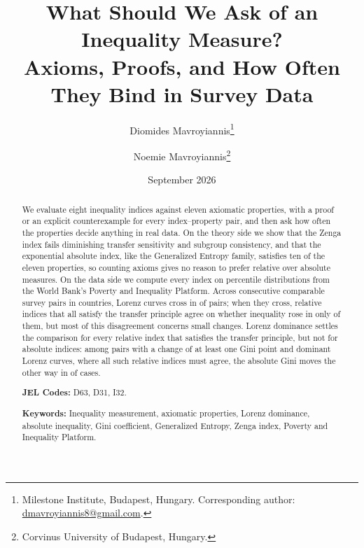 \documentclass[12pt]{article}
\theoremstyle{plain}
\theoremstyle{definition}
\theoremstyle{remark}
\begin{document}
\title{What Should We Ask of an Inequality Measure?\\[0.3em]
\large Axioms, Proofs, and How Often They Bind in Survey Data}
\author{
Diomides Mavroyiannis\thanks{Milestone Institute, Budapest, Hungary. Corresponding author: \href{mailto:dmavroyiannis8@gmail.com}{dmavroyiannis8@gmail.com}.}
\and
Noemie Mavroyiannis\thanks{Corvinus University of Budapest, Hungary.}
}
\date{September 2026}
\maketitle

\begin{abstract}
\noindent
We evaluate eight inequality indices against eleven axiomatic properties, with a proof or an explicit counterexample for every index--property pair, and then ask how often the properties decide anything in real data.
On the theory side we show that the Zenga index fails diminishing transfer sensitivity and subgroup consistency, and that the exponential absolute index, like the Generalized Entropy family, satisfies ten of the eleven properties, so counting axioms gives no reason to prefer relative over absolute measures.
On the data side we compute every index on \PipDistributions{} percentile distributions from the World Bank's Poverty and Inequality Platform.
Across \PipPairs{} consecutive comparable survey pairs in \PipCountries{} countries, Lorenz curves cross in \PipShareCross{} of pairs; when they cross, relative indices that all satisfy the transfer principle agree on whether inequality rose in only \PipTpAgreeCross{} of them, but most of this disagreement concerns small changes.
Lorenz dominance settles the comparison for every relative index that satisfies the transfer principle, but not for absolute indices: among pairs with a change of at least one Gini point and dominant Lorenz curves, where all such relative indices must agree, the absolute Gini moves the other way in \PipRelAbsOppMaterialDom{} of cases.

\medskip
\noindent\textbf{JEL Codes:} D63, D31, I32.

\medskip
\noindent\textbf{Keywords:} Inequality measurement, axiomatic properties, Lorenz dominance, absolute inequality, Gini coefficient, Generalized Entropy, Zenga index, Poverty and Inequality Platform.
\end{abstract}

\newpage

\end{document}
